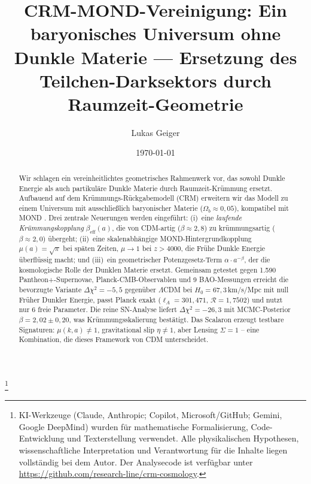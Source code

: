 \documentclass[aps,prd,twocolumn,superscriptaddress,nofootinbib]{revtex4-2}
\begin{document}

\title{CRM-MOND-Vereinigung: Ein baryonisches Universum ohne Dunkle Materie --- Ersetzung des Teilchen-Darksektors durch Raumzeit-Geometrie}

\author{Lukas Geiger}

\date{\today}


\begin{abstract}
Wir schlagen ein vereinheitlichtes geometrisches Rahmenwerk vor, das sowohl Dunkle Energie als auch partikul\"are Dunkle Materie durch Raumzeit-Kr\"ummung ersetzt. Aufbauend auf dem Kr\"ummungs-R\"uckgabemodell (CRM) \cite{Geiger2026} erweitern wir das Modell zu einem Universum mit ausschlie\ss{}lich baryonischer Materie ($\Omega_b \approx 0{,}05$), kompatibel mit MOND \cite{Milgrom1983}. Drei zentrale Neuerungen werden eingef\"uhrt: (i)~eine \textit{laufende Kr\"ummungskopplung} $\beta_{\mathrm{eff}}(a)$, die von CDM-artig ($\beta \approx 2{,}8$) zu kr\"ummungsartig ($\beta \approx 2{,}0$) \"ubergeht; (ii)~eine skalenabh\"angige MOND-Hintergrundkopplung $\mu(a) = \sqrt{\pi}$ bei sp\"aten Zeiten, $\mu \to 1$ bei $z > 4000$, die Fr\"uhe Dunkle Energie \"uberfl\"ussig macht; und (iii)~ein geometrischer Potenzgesetz-Term $\alpha \cdot a^{-\beta}$, der die kosmologische Rolle der Dunklen Materie ersetzt. Gemeinsam getestet gegen 1.590 Pantheon+-Supernovae, Planck-CMB-Observablen und 9 BAO-Messungen erreicht die bevorzugte Variante $\Delta\chi^2 = -5{,}5$ gegen\"uber $\Lambda$CDM bei $H_0 = 67{,}3$\,km/s/Mpc mit null Fr\"uher Dunkler Energie, passt Planck exakt ($\ell_A = 301{,}471$, $\mathcal{R} = 1{,}7502$) und nutzt nur 6 freie Parameter. Die reine SN-Analyse liefert $\Delta\chi^2 = -26{,}3$ mit MCMC-Posterior $\beta = 2{,}02 \pm 0{,}20$, was Kr\"ummungsskalierung best\"atigt. Das Scalaron erzeugt testbare Signaturen: $\mu(k,a) \neq 1$, gravitational slip $\eta \neq 1$, aber Lensing $\Sigma = 1$ -- eine Kombination, die dieses Framework von CDM unterscheidet.

\end{abstract}


\thanks{KI-Werkzeuge (Claude, Anthropic; Copilot, Microsoft/GitHub; Gemini, Google DeepMind) wurden für mathematische Formalisierung, Code-Entwicklung und Texterstellung verwendet. Alle physikalischen Hypothesen, wissenschaftliche Interpretation und Verantwortung für die Inhalte liegen vollständig bei dem Autor. Der Analysecode ist verfügbar unter \url{https://github.com/research-line/crm-cosmology}.}
\end{document}
